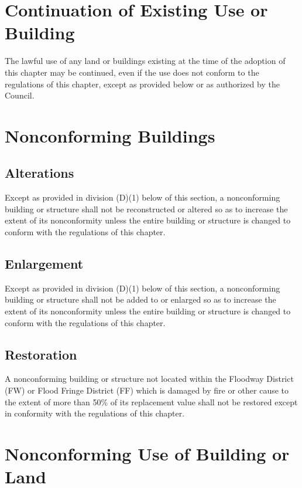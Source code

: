 
\setcounter{section}{114}
\section{Continuation of Existing Use or Building}
The lawful use of any land or buildings existing at the time of the adoption of this chapter may be continued, even if the use does not conform to the regulations of this chapter, except as provided below or as authorized by the Council.

\section{Nonconforming Buildings}
\subsection{Alterations}
Except as provided in division (D)(1) below of this section, a nonconforming building or structure shall not be reconstructed or altered so as to increase the extent of its nonconformity unless the entire building or structure is changed to conform with the regulations of this chapter.
\subsection{Enlargement}
Except as provided in division (D)(1) below of this section, a nonconforming building or structure shall not be added to or enlarged so as to increase the extent of its nonconformity unless the entire building or structure is changed to conform with the regulations of this chapter.
\subsection{Restoration}
A nonconforming building or structure not located within the Floodway District (FW) or Flood Fringe District (FF) which is damaged by fire or other cause to the extent of more than 50\% of its replacement value shall not be restored except in conformity with the regulations of this chapter.

\section{Nonconforming Use of Building or Land}
